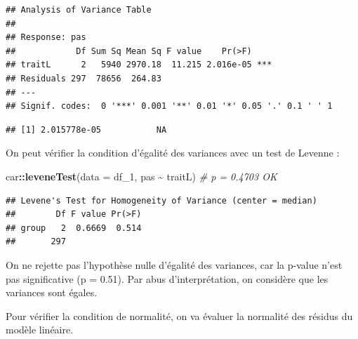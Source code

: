 \documentclass[
]{book}
\newenvironment{Shaded}{\begin{snugshade}}{\end{snugshade}}
\newcommand{\AttributeTok}[1]{\textcolor[rgb]{0.13,0.29,0.53}{#1}}
\newcommand{\CommentTok}[1]{\textcolor[rgb]{0.56,0.35,0.01}{\textit{#1}}}
\newcommand{\DocumentationTok}[1]{\textcolor[rgb]{0.56,0.35,0.01}{\textbf{\textit{#1}}}}
\newcommand{\FunctionTok}[1]{\textcolor[rgb]{0.13,0.29,0.53}{\textbf{#1}}}
\newcommand{\NormalTok}[1]{#1}
\newcommand{\SpecialCharTok}[1]{\textcolor[rgb]{0.81,0.36,0.00}{\textbf{#1}}}
\newcommand{\StringTok}[1]{\textcolor[rgb]{0.31,0.60,0.02}{#1}}
\begin{document}
\begin{verbatim}
## Analysis of Variance Table
## 
## Response: pas
##            Df Sum Sq Mean Sq F value    Pr(>F)    
## traitL      2   5940 2970.18  11.215 2.016e-05 ***
## Residuals 297  78656  264.83                      
## ---
## Signif. codes:  0 '***' 0.001 '**' 0.01 '*' 0.05 '.' 0.1 ' ' 1
\end{verbatim}

\begin{Shaded}
\end{Shaded}

\begin{verbatim}
## [1] 2.015778e-05           NA
\end{verbatim}

On peut vérifier la condition d'égalité des variances avec un test de Levenne :

\begin{Shaded}
\begin{Highlighting}[]
\NormalTok{car}\SpecialCharTok{::}\FunctionTok{leveneTest}\NormalTok{(}\AttributeTok{data =}\NormalTok{ df\_1, pas }\SpecialCharTok{\textasciitilde{}}\NormalTok{ traitL) }\CommentTok{\# p = 0.4703   OK}
\end{Highlighting}
\end{Shaded}

\begin{verbatim}
## Levene's Test for Homogeneity of Variance (center = median)
##        Df F value Pr(>F)
## group   2  0.6669  0.514
##       297
\end{verbatim}

On ne rejette pas l'hypothèse nulle d'égalité des variances, car la p-value n'est pas significative (p = 0.51). Par abus d'interprétation, on considère que les variances sont égales.

Pour vérifier la condition de normalité, on va évaluer la normalité des résidus du modèle linéaire.
\end{document}
